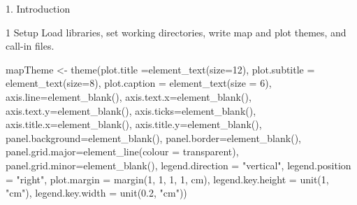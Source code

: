 \documentclass[
  ignorenonframetext,
]{beamer}
\newenvironment{Shaded}{\begin{snugshade}}{\end{snugshade}}
\newcommand{\AttributeTok}[1]{\textcolor[rgb]{0.77,0.63,0.00}{#1}}
\newcommand{\DecValTok}[1]{\textcolor[rgb]{0.00,0.00,0.81}{#1}}
\newcommand{\FloatTok}[1]{\textcolor[rgb]{0.00,0.00,0.81}{#1}}
\newcommand{\FunctionTok}[1]{\textcolor[rgb]{0.00,0.00,0.00}{#1}}
\newcommand{\NormalTok}[1]{#1}
\newcommand{\OtherTok}[1]{\textcolor[rgb]{0.56,0.35,0.01}{#1}}
\newcommand{\StringTok}[1]{\textcolor[rgb]{0.31,0.60,0.02}{#1}}
\begin{document}
\begin{frame}[fragile]{1. Introduction}
\begin{block}{1 Setup}
\protect\hypertarget{setup}{}
Load libraries, set working directories, write map and plot themes, and
call-in files.

\begin{Shaded}
\begin{Highlighting}[]
\NormalTok{mapTheme }\OtherTok{\textless{}{-}} \FunctionTok{theme}\NormalTok{(}\AttributeTok{plot.title =}\FunctionTok{element\_text}\NormalTok{(}\AttributeTok{size=}\DecValTok{12}\NormalTok{),}
                  \AttributeTok{plot.subtitle =} \FunctionTok{element\_text}\NormalTok{(}\AttributeTok{size=}\DecValTok{8}\NormalTok{),}
                  \AttributeTok{plot.caption =} \FunctionTok{element\_text}\NormalTok{(}\AttributeTok{size =} \DecValTok{6}\NormalTok{),}
                  \AttributeTok{axis.line=}\FunctionTok{element\_blank}\NormalTok{(),}
                  \AttributeTok{axis.text.x=}\FunctionTok{element\_blank}\NormalTok{(),}
                  \AttributeTok{axis.text.y=}\FunctionTok{element\_blank}\NormalTok{(),}
                  \AttributeTok{axis.ticks=}\FunctionTok{element\_blank}\NormalTok{(),}
                  \AttributeTok{axis.title.x=}\FunctionTok{element\_blank}\NormalTok{(),}
                  \AttributeTok{axis.title.y=}\FunctionTok{element\_blank}\NormalTok{(),}
                  \AttributeTok{panel.background=}\FunctionTok{element\_blank}\NormalTok{(),}
                  \AttributeTok{panel.border=}\FunctionTok{element\_blank}\NormalTok{(),}
                  \AttributeTok{panel.grid.major=}\FunctionTok{element\_line}\NormalTok{(}\AttributeTok{colour =} \StringTok{\textquotesingle{}transparent\textquotesingle{}}\NormalTok{),}
                  \AttributeTok{panel.grid.minor=}\FunctionTok{element\_blank}\NormalTok{(),}
                  \AttributeTok{legend.direction =} \StringTok{"vertical"}\NormalTok{, }
                  \AttributeTok{legend.position =} \StringTok{"right"}\NormalTok{,}
                  \AttributeTok{plot.margin =} \FunctionTok{margin}\NormalTok{(}\DecValTok{1}\NormalTok{, }\DecValTok{1}\NormalTok{, }\DecValTok{1}\NormalTok{, }\DecValTok{1}\NormalTok{, }\StringTok{\textquotesingle{}cm\textquotesingle{}}\NormalTok{),}
                  \AttributeTok{legend.key.height =} \FunctionTok{unit}\NormalTok{(}\DecValTok{1}\NormalTok{, }\StringTok{"cm"}\NormalTok{), }\AttributeTok{legend.key.width =} \FunctionTok{unit}\NormalTok{(}\FloatTok{0.2}\NormalTok{, }\StringTok{"cm"}\NormalTok{))}


\end{Highlighting}
\end{Shaded}
\end{block}
\end{frame}
\end{document}
